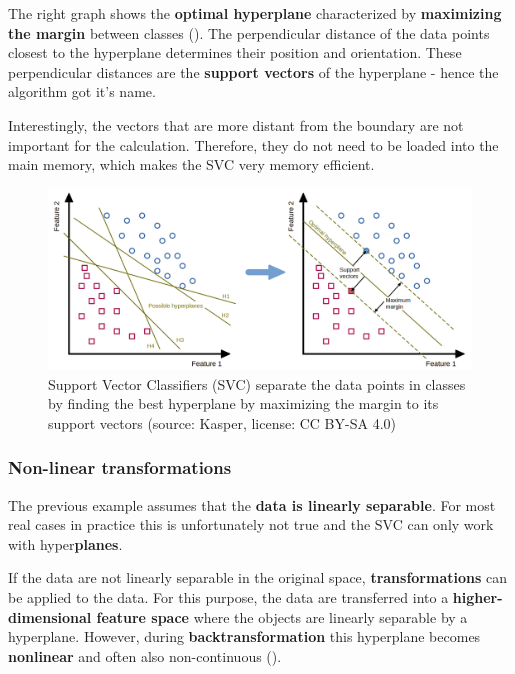 \documentclass [oneside,10pt,a4paper,ngerman,BCOR10mm,headsepline,parindent,final]{scrartcl}
\begin{document}
The right graph shows the \textbf{optimal hyperplane} characterized by
\textbf{maximizing the margin} between classes
(\cite{Parameter_tuning_SVC}). The perpendicular distance of the data
points closest to the hyperplane determines their position and
orientation. These perpendicular distances are the \textbf{support
vectors} of the hyperplane - hence the algorithm got it's name.

Interestingly, the vectors that are more distant from the boundary are
not important for the calculation. Therefore, they do not need to be
loaded into the main memory, which makes the SVC very memory efficient.

    \begin{figure}
\centering
\includegraphics{images/SVC_operatingPrinciple.png}
\caption{Support Vector Classifiers (SVC) separate the data points in
classes by finding the best hyperplane by maximizing the margin to its
support vectors (source: Kasper, license: CC BY-SA 4.0)}
\end{figure}

    \hypertarget{non-linear-transformations}{%
\subsubsection{Non-linear
transformations}\label{non-linear-transformations}}

The previous example assumes that the \textbf{data is linearly
separable}. For most real cases in practice this is unfortunately not
true and the SVC can only work with hyper\textbf{planes}.

If the data are not linearly separable in the original space,
\textbf{transformations} can be applied to the data. For this purpose,
the data are transferred into a \textbf{higher-dimensional feature
space} where the objects are linearly separable by a hyperplane.
However, during \textbf{backtransformation} this hyperplane becomes
\textbf{nonlinear} and often also non-continuous
(\cite{SVM_Python_2019}).
\end{document}
